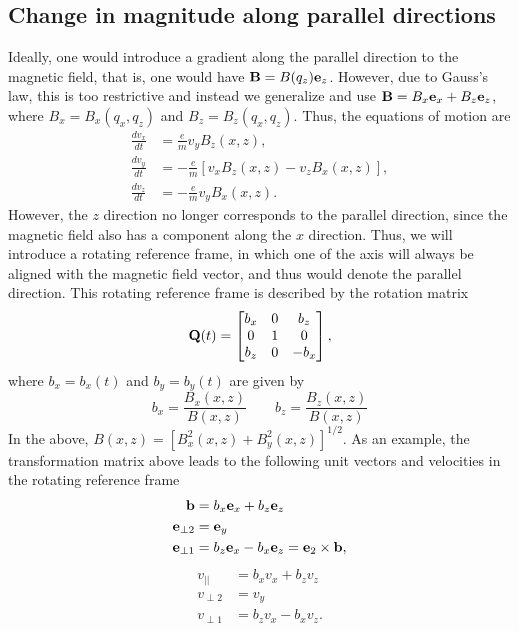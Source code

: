 \documentclass[oneside,a4paper,11pt]{report}
\begin{document}
\subsection{Change in magnitude along parallel directions}
Ideally, one would introduce a gradient along the parallel direction to the magnetic field, that is, one would have $\mathbf{B} = B(q_z) \mathbf{e}_z$. However, due to Gauss's law, this is too restrictive and instead we generalize and use $\mathbf{B} = B_x \mathbf{e}_x + B_z \mathbf{e}_z$, where $B_x = B_x(q_x,q_z)$ and $B_z = B_z(q_x,q_z)$. Thus, the equations of motion are
\begin{align}
    \frac{dv_x}{dt} &= \frac{e}{m} v_y B_z(x,z) , \label{eq:par_grad_vx_inter}\\
    \frac{dv_y}{dt} &= -\frac{e}{m} [v_x B_z(x,z) - v_z B_x(x,z)] , \label{eq:par_grad_vy_inter}\\
    \frac{dv_z}{dt} &= -\frac{e}{m} v_y B_x(x,z) \label{eq:par_grad_vz_inter}.
\end{align}
However, the $z$ direction no longer corresponds to the parallel direction, since the magnetic field also has a component along the $x$ direction. Thus, we will introduce a rotating reference frame, in which one of the axis will always be aligned with the magnetic field vector, and thus would denote the parallel direction. This rotating reference frame is described by the rotation matrix
\begin{equation}
    \mathbf{Q}(t) = \begin{bmatrix} b_x & 0 & b_z \\ 0 & 1 & 0 \\ b_z & 0 & -b_x \end{bmatrix},
\end{equation}
where $b_x = b_x(t)$ and $b_y = b_y(t)$ are given by
\begin{equation}
    b_x = \frac{B_x(x,z)}{B(x,z)} \qquad b_z = \frac{B_z(x,z)}{B(x,z)}
\end{equation}
In the above, $B(x,z) = [ B_x^2(x,z) + B_y^2(x,z) ]^{1/2}$. As an example, the transformation matrix above leads to the following unit vectors and velocities in the rotating reference frame 
\begin{align}
    \mathbf{b} &= b_x \mathbf{e}_x + b_z \mathbf{e}_z \\
    \mathbf{e}_{\perp2} &= \mathbf{e}_y \\
    \mathbf{e}_{\perp1} &= b_z \mathbf{e}_x - b_x \mathbf{e}_z = \mathbf{e}_2 \times \mathbf{b},
\end{align}
\begin{align}
    v_{||} &= b_x v_x + b_z v_z \label{eq:par_grad_vel_trans_1}\\
    v_{\perp2} &= v_y \label{eq:par_grad_vel_trans_2}\\
    v_{\perp1} &= b_z v_x - b_x v_z. \label{eq:par_grad_vel_trans_3}
\end{align}
\end{document}
